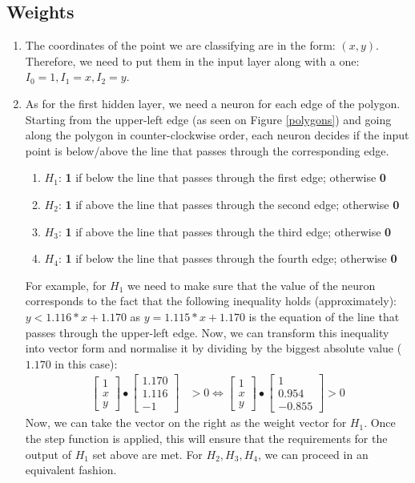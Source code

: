 \documentclass[12pt]{article}
\begin{document}
\subsection*{Weights}
\begin{enumerate}
\item The coordinates of the point we are classifying are in the form: $(x,y)$. Therefore, we need to put them in the input layer along with a one: $I_0=1, I_1=x, I_2 = y$.
\item As for the first hidden layer, we need a neuron for each edge of the polygon. Starting from the upper-left edge (as seen on Figure \ref{polygons}) and going along the polygon in counter-clockwise order, each neuron decides if the input point is below/above the line that passes through the corresponding edge.
\begin{enumerate}
\item \underline{$H_1$}: \textbf{1} if below the line that passes through the first edge; otherwise
\textbf{0}
\item \underline{$H_2$}: \textbf{1} if above the line that passes through the second edge; otherwise \textbf{0}
\item \underline{$H_3$}: \textbf{1} if above the line that passes through the third edge; otherwise \textbf{0}
\item \underline{$H_4$}: \textbf{1} if below the line that passes through the fourth edge; otherwise \textbf{0}
\end{enumerate}
For example, for $H_1$ we need to make sure that the value of the neuron corresponds to the fact that the following inequality holds (approximately): $y < 1.116 * x + 1.170$ as $y = 1.115 * x + 1.170$ is the equation of the line that passes through the upper-left edge. Now, we can transform this inequality into vector form and normalise it by dividing by the biggest absolute value ($1.170$ in this case): 
\begin{align}
     \begin{bmatrix}
           1 \\
           x \\
           y
         \end{bmatrix} \bullet \begin{bmatrix}
           1.170 \\
           1.116 \\
           -1
         \end{bmatrix} &> 0 \Leftrightarrow \begin{bmatrix}
           1 \\
           x \\
           y
         \end{bmatrix}  \bullet \begin{bmatrix}
           1 \\
           0.954 \\
           -0.855
         \end{bmatrix} > 0
  \end{align}
Now, we can take the vector on the right as the weight vector for $H_1$. Once the step function is applied, this will ensure that the requirements for the output of $H_1$ set above are met.
For $H_2, H_3, H_4$, we can proceed in an equivalent fashion.
  

\end{enumerate}
\end{document}
